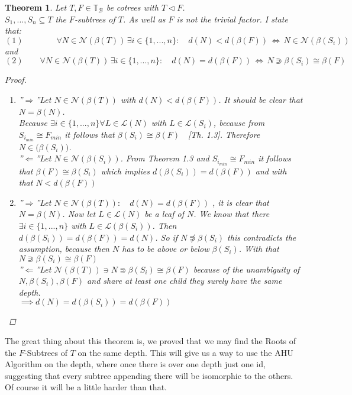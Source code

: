 \documentclass[a4paper,12pt]{article}
\newtheorem{theorem}{Theorem}[section]
\theoremstyle{definition}
\begin{document}
		\begin{theorem}
			Let $T,F\in\mathds{T}_{\mathcal{B}}$ be cotrees with $T\vartriangleleft F$.\\ $S_1,...,S_n\subseteq T$ the $F$-subtrees of $T$. As well as $F$ is not the trivial factor. I state that:
			\[(1)\qquad \qquad \forall N\in \mathcal{N}(\beta(T))\, \exists i\in\{1,...,n\}:\quad d(N)< d(\beta(F))\,\Longleftrightarrow\, N\in \mathcal{N}(\beta(S_i)) \]
			and 
			\[(2)\qquad \forall N\in \mathcal{N}(\beta(T))\, \exists i\in\{1,...,n\}:\quad d(N)= d(\beta(F))\,\Longleftrightarrow\, N \Supset \beta(S_i)\cong \beta(F) \]
			\begin{proof}
				\begin{enumerate}[(1)]
					\item ''$\Rightarrow$''\quad Let  $ N\in \mathcal{N}(\beta(T))$ with $ d(N)< d(\beta(F))$. It should be clear that $N=\beta (N)$.\\ Because $\exists i\in\{1,...,n\}\forall L \in \mathcal{L}(N)$ with $L\in \mathcal{L}(S_i)$, because from $S_{i_{min}} \cong F_{min}$ it follows that $\beta (S_i) \cong \beta (F)\quad$[Th. 1.3]. Therefore $N \in \mathcal(\beta(S_i))$.  \\
							''$\Leftarrow$''\quad Let $N\in \mathcal{N}(\beta (S_i))$. From Theorem 1.3 and $ S_{i_{min}} \cong F_{min}$ it follows that $\beta (F) \cong \beta (S_i)$ which implies $d(\beta (S_i))=d(\beta (F))$ and with that $N<d(\beta(F))$
					\item ''$\Rightarrow$''\quad Let $N\in \mathcal{N}(\beta(T)):\quad d(N) = d(\beta (F))$ , it is clear that $N=\beta(N)$. Now let $L\in \mathcal{L}(N)$ be a leaf of $N$. We know that there $\exists i\in \{1,...,n\}$ with $L\in \mathcal{L}(\beta (S_i))$. Then $d(\beta(S_i)) = d(\beta (F)) = d(N)$. So if $N \not \Supset \beta(S_i)$ this contradicts the assumption, because then $N$ has to be above or below $\beta(S_i)$. With that $N  \Supset \beta(S_i)\cong \beta (F)$\\
					''$\Leftarrow$''\quad Let $\mathcal{N}(\beta(T)) \ni N \Supset \beta(S_i) \cong \beta(F)$ because of the unambiguity of $N,\beta(S_i),\beta (F)$ and share at least one child they surely have the same depth.\\
					$\implies d(N)=d(\beta(S_i))=d(\beta(F))$
				\end{enumerate}
			\end{proof}
		\end{theorem}
		The great thing about this theorem is, we proved that we may find the Roots of the $F$-Subtrees of $T$ on the same depth. This will give us a way to use the AHU Algorithm on the depth, where once there is over one depth just one id, suggesting that every subtree appending there will be isomorphic to the others. Of course it will be a little harder than that.
\end{document}
